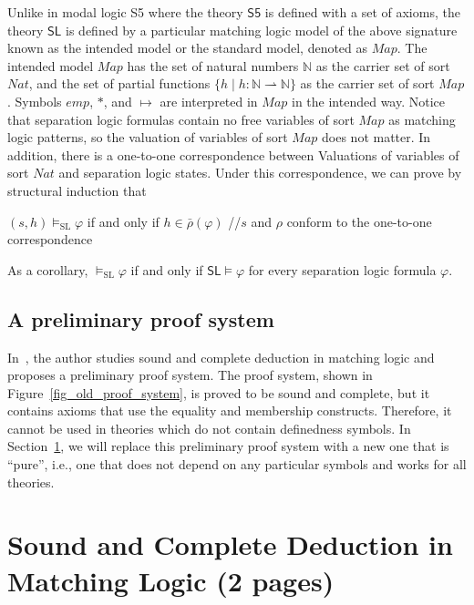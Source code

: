 \documentclass[acmsmall,review,anonymous]{acmart}
\newcommand{\doubleslash}{//\xspace}
\newcommand{\barrho}{\bar{\rho}}
\newcommand{\MLSfive}{\mathsf{S5}}
\newcommand{\MLSL}{\mathsf{SL}}
\newcommand{\Nat}{\mathit{Nat}}
\newcommand{\Map}{\mathit{Map}}
\newcommand{\emp}{\mathit{emp}}
\newcommand{\merge}{\mathbin{*}}
\newcommand{\pto}{\rightharpoonup}
\newcommand{\SL}{{\text{SL}}}
\begin{document}
\newcommand{\N}{\mathbb{N}}

Unlike in modal logic S5 where the theory $\MLSfive$ is defined with a set of
axioms,
the theory $\MLSL$ is defined by 
a particular matching logic model 
of the above signature
known as the intended model or the standard model, denoted as $\Map$.
The intended model $\Map$ has the set of natural numbers $\N$ as the carrier
set of sort $\Nat$,
and the set of partial functions 
$ \{ h \mid h \colon \N \pto \N \} $
as the carrier set of sort $\Map$.
Symbols $\emp$, $\merge$, and $\mapsto$ are interpreted in $\Map$ in the
intended way.
Notice that separation logic formulas contain no free variables of sort $\Map$
as matching logic patterns,
so the valuation of variables of sort $\Map$ does not matter.
In addition, there is a one-to-one correspondence between 
Valuations of variables of sort $\Nat$ and separation logic states.
Under this correspondence, we can prove by structural induction that
\begin{center}
$(s,h) \vDash_\SL \varphi$
 if and only if 
$h \in \barrho(\varphi)$
\quad \doubleslash $s$ and $\rho$ conform to the one-to-one correspondence
\end{center}
As a corollary,
$\vDash_\SL \varphi$ if and only if
$\MLSL \vDash \varphi$ for every separation logic formula $\varphi$.



\subsection{A preliminary proof system}

In~\cite{rosu-2017-lmcs},
the author studies sound and complete deduction in matching logic
and proposes a preliminary proof system.
The proof system, shown in Figure~\ref{fig_old_proof_system},
is proved to be sound and complete, 
but it contains axioms that use the equality and membership constructs.
Therefore, it cannot be used in theories which do not contain 
definedness symbols.
In Section~\ref{sec_pure_matching_logic},
we will replace this preliminary proof system with
a new one that is ``pure'',
i.e., one that
does not depend on any particular symbols and works for all theories.


\section{Sound and Complete Deduction in Matching Logic (2 pages)}
\label{sec_pure_matching_logic}
\end{document}
